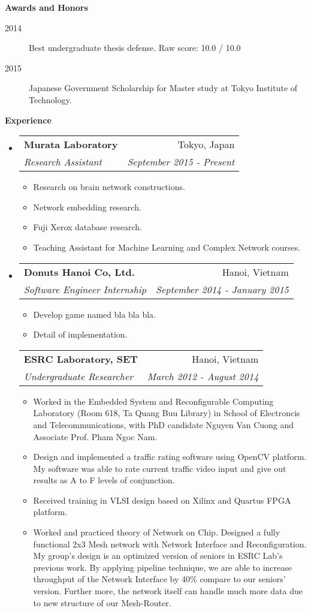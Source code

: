 \documentclass[letter,11pt]{article}
\makeatletter
\newcommand{\resitem}[1]{\item #1 \vspace{-2pt}}
\newcommand{\resheading}[1]{{\large \colorbox{mygrey}{\begin{minipage}{\textwidth}{\textbf{#1 \vphantom{p\^{E}}}}\end{minipage}}}}
\newcommand{\ressubheading}[4]{
\begin{tabular*}{6.5in}{l@{\extracolsep{\fill}}r}
		\textbf{#1} & #2 \\
		\textit{#3} & \textit{#4} \\
\end{tabular*}\vspace{-6pt}}
\makeatother
\begin{document}
\resheading{Awards and Honors}
	\begin{description}
		\resitem[2014] Best undergraduate thesis defense. Raw score: 10.0 / 10.0
		\resitem[2015] Japanese Government Scholarship for Master study at Tokyo Institute of Technology.
    \end{description}

\resheading{Experience}
\begin{itemize}
\item
    \ressubheading{Murata Laboratory}{Tokyo, Japan}{Research Assistant}{September 2015 - Present}
    \begin{itemize}
        \resitem{Research on brain network constructions.}
        \resitem{Network embedding research.}
        \resitem{Fuji Xerox database research.}
        \resitem{Teaching Assistant for Machine Learning and Complex Network courses.}
    \end{itemize}
\item
    \ressubheading{Donuts Hanoi Co, Ltd.}{Hanoi, Vietnam}{Software Engineer Internship}{September 2014 - January 2015}
    \begin{itemize}
        \resitem{Develop game named bla bla bla.}
        \resitem{Detail of implementation.}
    \end{itemize}
	\ressubheading{ESRC Laboratory, SET}{Hanoi, Vietnam}{Undergraduate Researcher}{March 2012 - August 2014}
	\begin{itemize}
		\resitem{Worked in the Embedded System and Reconfigurable Computing Laboratory (Room 618, Ta Quang Buu Library) in School of Electroncis and Telecommunications, with PhD candidate Nguyen Van Cuong and Associate Prof. Pham Ngoc Nam.}
		\resitem{Design and implemented a traffic rating software using OpenCV platform. My software was able to rate current traffic video input and give out results as A to F levels of conjunction.}
		\resitem{Received training in VLSI design based on Xilinx and Quartus FPGA platform.}
		\resitem{Worked and practiced theory of Network on Chip. Designed a fully functional 2x3 Mesh network with Network Interface and Reconfiguration. My group's design is an optimized version of seniors in ESRC Lab's previous work. By applying pipeline technique, we are able to increase throughput of the Network Interface by 40\% compare to our seniors' version. Further more, the network itself can handle much more data due to new structure of our Mesh-Router.}
	\end{itemize}
\end{itemize}
\end{document}
